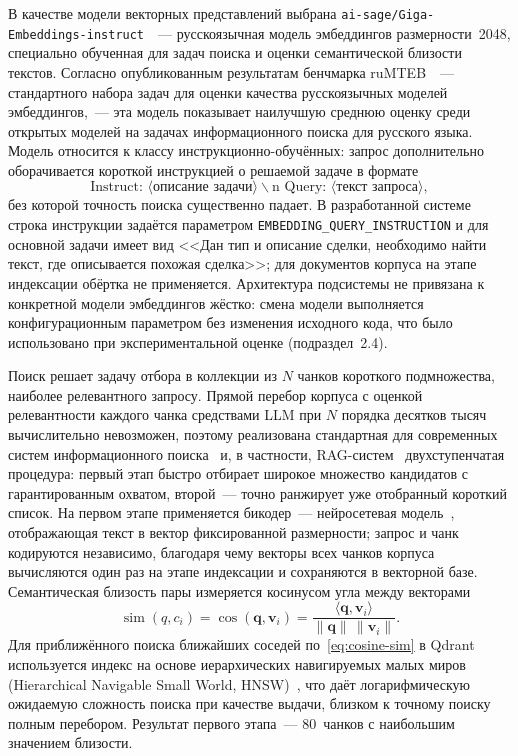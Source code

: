 В качестве модели векторных представлений выбрана \texttt{ai-sage/Giga-Embeddings-instruct}~\cite{ai_sage_gigaemb}~--- русскоязычная модель эмбеддингов размерности~2048, специально обученная для задач поиска и оценки семантической близости текстов. Согласно опубликованным результатам бенчмарка ruMTEB~\cite{snegirev2024rumteb}~--- стандартного набора задач для оценки качества русскоязычных моделей эмбеддингов,~--- эта модель показывает наилучшую среднюю оценку среди открытых моделей на задачах информационного поиска для русского языка. Модель относится к классу инструкционно-обучённых: запрос дополнительно оборачивается короткой инструкцией о решаемой задаче в формате
\begin{equation*}
\text{Instruct: }\langle\textit{описание задачи}\rangle\backslash\text{n Query: }\langle\textit{текст запроса}\rangle,
\end{equation*}
без которой точность поиска существенно падает. В разработанной системе строка инструкции задаётся параметром \texttt{EMBEDDING\_QUERY\_INSTRUCTION} и для основной задачи имеет вид <<Дан тип и описание сделки, необходимо найти текст, где описывается похожая сделка>>; для документов корпуса на этапе индексации обёртка не применяется. Архитектура подсистемы не привязана к конкретной модели эмбеддингов жёстко: смена модели выполняется конфигурационным параметром без изменения исходного кода, что было использовано при экспериментальной оценке (подраздел~2.4).

Поиск решает задачу отбора в коллекции из $N$ чанков короткого подмножества, наиболее релевантного запросу. Прямой перебор корпуса с оценкой релевантности каждого чанка средствами LLM при $N$ порядка десятков тысяч вычислительно невозможен, поэтому реализована стандартная для современных систем информационного поиска~\cite{manning2008ir} и, в частности, RAG-систем~\cite{qdrant_reranking} двухступенчатая процедура: первый этап быстро отбирает широкое множество кандидатов с гарантированным охватом, второй~--- точно ранжирует уже отобранный короткий список. На первом этапе применяется бикодер~--- нейросетевая модель~\cite{goodfellow2016deep}, отображающая текст в вектор фиксированной размерности; запрос и чанк кодируются независимо, благодаря чему векторы всех чанков корпуса вычисляются один раз на этапе индексации и сохраняются в векторной базе. Семантическая близость пары измеряется косинусом угла между векторами
\begin{equation}
\operatorname{sim}(q, c_i) = \cos(\mathbf{q}, \mathbf{v}_i) = \frac{\langle \mathbf{q}, \mathbf{v}_i \rangle}{\|\mathbf{q}\|\,\|\mathbf{v}_i\|}.
\label{eq:cosine-sim}
\end{equation}
Для приближённого поиска ближайших соседей по~\eqref{eq:cosine-sim} в Qdrant используется индекс на основе иерархических навигируемых малых миров (Hierarchical Navigable Small World, HNSW)~\cite{malkov2020hnsw}, что даёт логарифмическую ожидаемую сложность поиска при качестве выдачи, близком к точному поиску полным перебором. Результат первого этапа~--- 80~чанков с наибольшим значением близости.

